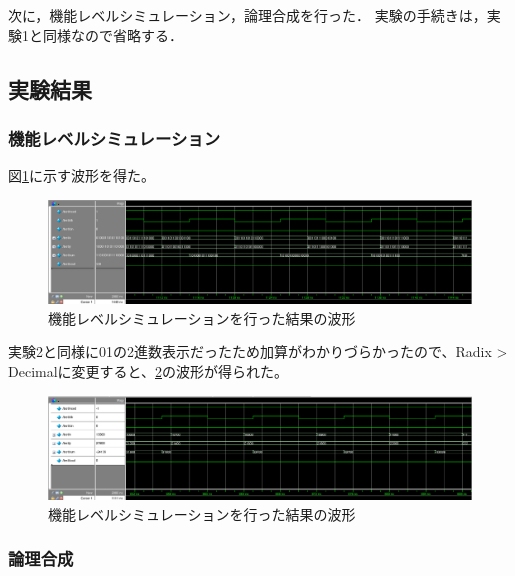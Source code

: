 \documentclass[uplatex]{jsarticle}
\begin{document}
次に，機能レベルシミュレーション，論理合成を行った．
実験の手続きは，実験1と同様なので省略する．

\subsection{実験結果}

\subsubsection{機能レベルシミュレーション}

図\ref{fig:11}に示す波形を得た。

\begin{figure}[htb]
  \begin{center}
    \includegraphics[width=13cm]{images/fig11.eps}
    \caption{機能レベルシミュレーションを行った結果の波形}
    \label{fig:11}
  \end{center}
\end{figure}

実験2と同様に01の2進数表示だったため加算がわかりづらかったので、Radix > Decimalに変更すると、\ref{fig:11-1}の波形が得られた。

\begin{figure}[htb]
  \begin{center}
    \includegraphics[width=13cm]{images/fig11-1.eps}
    \caption{機能レベルシミュレーションを行った結果の波形}
    \label{fig:11-1}
  \end{center}
\end{figure}

\subsubsection{論理合成}
\end{document}

